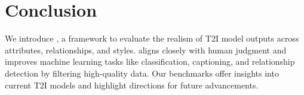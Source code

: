 \section{Conclusion}
We introduce \name, a framework to evaluate the realism of T2I model outputs across attributes, relationships, and styles. \name aligns closely with human judgment and improves machine learning tasks like classification, captioning, and relationship detection by filtering high-quality data. Our benchmarks offer insights into current T2I models and highlight directions for future advancements.